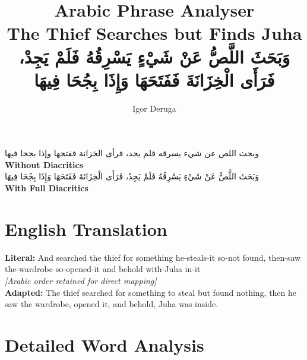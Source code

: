 \documentclass[letter,12pt]{article}
\begin{document}
\title{\textbf{\Large Arabic Phrase Analyser}\\
\large The Thief Searches but Finds Juha\\
\normalsize \textarabic{وَبَحَثَ اللَّصُّ عَنْ شَيْءٍ يَسْرِقُهُ فَلَمْ يَجِدْ، فَرَأَى الْخِزَانَةَ فَفَتَحَهَا وَإِذَا بِجُحَا فِيهَا}}
\author{Igor Deruga}
\date{}
\maketitle

\begin{tcolorbox}[colback=boxcolor,colframe=headercolor,title=\textbf{Arabic Phrase},breakable]
\centering
\textarabic{وبحث اللص عن شيء يسرقه فلم يجد، فرأى الخزانة ففتحها وإذا بجحا فيها}
\\[0.5em]
\textbf{Without Diacritics}
\\[1em]
\textarabic{وَبَحَثَ اللَّصُّ عَنْ شَيْءٍ يَسْرِقُهُ فَلَمْ يَجِدْ، فَرَأَى الْخِزَانَةَ فَفَتَحَهَا وَإِذَا بِجُحَا فِيهَا}
\\[0.5em]
\textbf{With Full Diacritics}
\end{tcolorbox}

\section{English Translation}
\begin{tcolorbox}[colback=white,colframe=accentcolor,breakable]
\textbf{Literal:} And searched the thief for something he-steals-it so-not found, then-saw the-wardrobe so-opened-it and behold with-Juha in-it \\
\textit{[Arabic order retained for direct mapping]}\\[0.5em]
\textbf{Adapted:} The thief searched for something to steal but found nothing, then he saw the wardrobe, opened it, and behold, Juha was inside.
\end{tcolorbox}

\section{Detailed Word Analysis}
\end{document}

